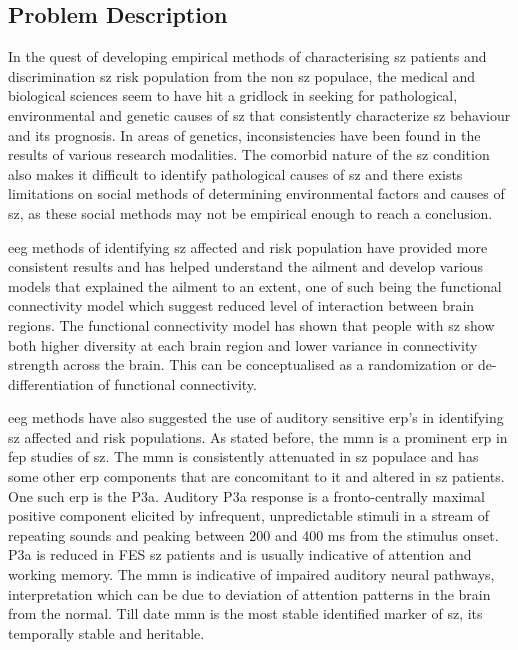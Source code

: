 \subsection{Problem Description}
In the quest of developing empirical methods of characterising \ac{sz} patients and discrimination \ac{sz} risk population from the non \ac{sz} populace, the medical and biological sciences seem to have hit a gridlock in seeking for pathological, environmental and genetic causes of \ac{sz} that consistently characterize \ac{sz} behaviour and its prognosis. In areas of genetics, inconsistencies have been found in the results of various research modalities. The comorbid nature of the \ac{sz} condition also makes it difficult to identify pathological causes of \ac{sz} and there exists limitations on social methods of determining environmental factors and causes of \ac{sz}, as these social methods may not be empirical enough to reach a conclusion.

\ac{eeg} methods of identifying \ac{sz} affected and risk population have provided more consistent results and has helped understand the ailment and develop various models that explained the ailment to an extent, one of such being the functional connectivity model which suggest reduced level of interaction between brain  regions. The functional connectivity model has shown that people with \ac{sz} show both higher diversity at each brain region and lower variance in connectivity strength across the brain. This can be conceptualised as a randomization or de-differentiation of functional connectivity.

\ac{eeg} methods have also suggested the use of auditory sensitive \ac{erp}'s in identifying \ac{sz} affected and risk populations. As stated before, the \ac{mmn} is a prominent \ac{erp} in \ac{fep} studies of \ac{sz}. The \ac{mmn} is consistently attenuated in \ac{sz} populace and has some other \ac{erp} components that are concomitant to it and altered in \ac{sz} patients. One such \ac{erp} is the P3a. Auditory P3a response is a fronto-centrally maximal positive component elicited by infrequent, unpredictable stimuli in a stream of repeating sounds and peaking between 200 and 400 ms from the stimulus onset. P3a is reduced in FES \ac{sz} patients and is usually indicative of attention and working memory. The \ac{mmn} is indicative of impaired auditory neural pathways, interpretation which can be due to deviation of attention patterns in the brain from the normal. Till date \ac{mmn} is the most stable identified marker of \ac{sz}, its temporally stable and heritable.

